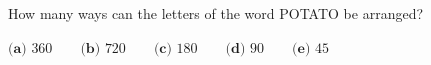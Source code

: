 How many ways can the letters of the word POTATO be arranged?

$\textbf{(a) }360\qquad\textbf{(b) }720\qquad\textbf{(c) }180\qquad\textbf{(d) }90\qquad\textbf{(e) }45$
